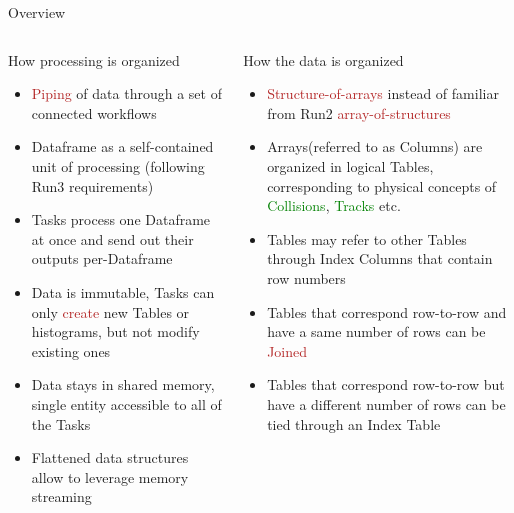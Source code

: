 \documentclass[10pt,lualatex,xcolor={table,svgnames},{hyperref={bookmarks=true,linktoc=all}},aspectratio=169]{beamer}
\newcommand{\logical}[1]{\textcolor{Green}{#1}}
\newcommand{\programmatic}[1]{\textcolor{-green!40!yellow}{#1}}
\newcommand{\operation}[1]{\textcolor{FireBrick}{#1}}
\begin{document}
\begin{frame}[shrink=11]{Overview}
    \vspace{2ex}
	\begin{columns}
    \begin{column}{0.45\textwidth}
        \begin{block}{How processing is organized}
            \begin{itemize}
                \item \operation{Piping} of data through a set of connected \programmatic{workflows}
                \item \programmatic{Dataframe} as a self-contained unit of processing (following Run3 requirements)
                \item \programmatic{Tasks} process one \programmatic{Dataframe} at once and send out their outputs per-\programmatic{Dataframe}
                \item Data is immutable, \programmatic{Tasks} can only \operation{create} new \programmatic{Tables} or histograms, but not modify existing ones
                \item Data stays in shared memory, single entity accessible to all of the \programmatic{Tasks}
                \item Flattened data structures allow to leverage memory streaming
            \end{itemize}
        \end{block}
    \end{column}
    \begin{column}{0.45\textwidth}
        \begin{block}{How the data is organized}
            \begin{itemize}
                \item \operation{Structure-of-arrays} instead of familiar from Run2 \operation{array-of-structures}
                \item Arrays(referred to as \programmatic{Columns}) are organized in logical \programmatic{Tables}, corresponding to physical concepts of \logical{Collisions}, \logical{Tracks} etc.
                \item \programmatic{Tables} may refer to other \programmatic{Tables} through \programmatic{Index Columns} that contain row numbers
                \item \programmatic{Tables} that correspond row-to-row and have a same number of rows can be \operation{Joined}
                \item \programmatic{Tables} that correspond row-to-row but have a different number of rows can be tied through an \programmatic{Index Table}
            \end{itemize}
        \end{block}
    \end{column}
    \end{columns}
\end{frame}
\end{document}
